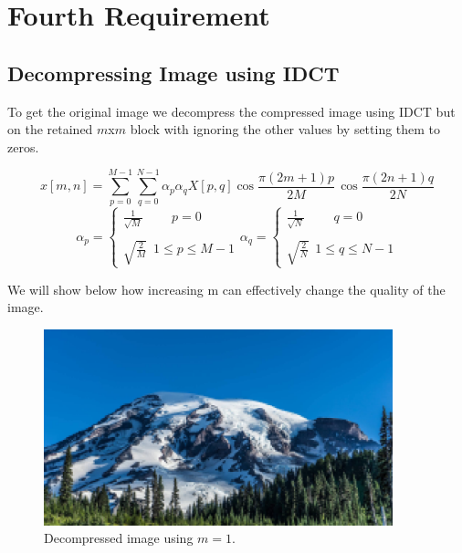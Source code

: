 \chapter{Fourth Requirement}
\section{Decompressing Image using IDCT}
To get the original image we decompress the compressed image using IDCT but on the retained $m$x$m$ block with ignoring the other values by setting them to zeros.

\begin{tcolorbox}[colback=green!8!white,colframe=green!40!black,title=\textbf{Inverse Discrete Cosines Transform}]
    $$x\left[m,n\right] =  \sum_{p=0}^{M-1}\sum_{q=0}^{N-1}\alpha_p \alpha_q X[p,q] \cos{\frac{\pi \left(2m+1\right)p}{2M}} \, \cos{\frac{\pi \left(2n+1\right)q}{2N}}$$
    $$\alpha_p = \begin{cases}
        \frac{1}{\sqrt{M}}\hspace{27pt} p=0 \\\\
        \sqrt{\frac{2}{M}}\,\,\, 1 \leq p \leq M - 1
    \end{cases}
    \alpha_q = \begin{cases}
        \frac{1}{\sqrt{N}}\hspace{27pt} q=0 \\\\
        \sqrt{\frac{2}{N}}\,\,\, 1 \leq q \leq N - 1
    \end{cases}
    $$
\end{tcolorbox}
\vspace{5pt}

\noindent We will show below how increasing m can effectively change the quality of the image.

\begin{figure}[h]
    \centering
    \includegraphics[width=0.9\textwidth]{../Report Images/decompressedImage_m1.png}
    \caption{Decompressed image using $m=1$.}
    \label{fig:decompressed_img_m1}
\end{figure}

